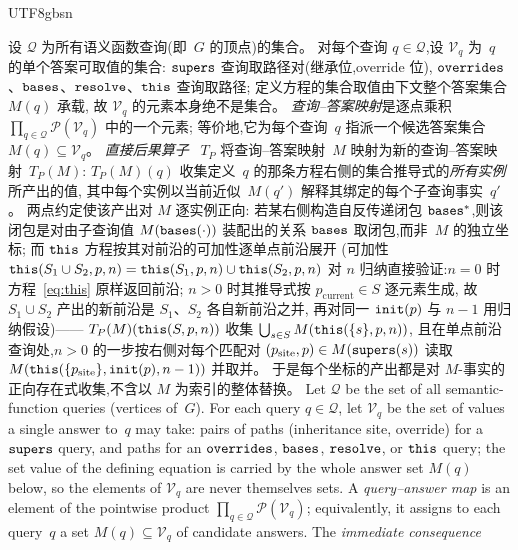\begin{CJK*}{UTF8}{gbsn}
\begin{definition}%
  \label{def:tp-operator}
\ifPaperChinese
  设 $\mathcal{Q}$ 为所有语义函数查询(即~$G$ 的顶点)的集合。
  对每个查询 $q \in \mathcal{Q}$,设 $\mathcal{V}_q$ 为~$q$ 的单个答案可取值的集合:
  $\mathtt{supers}$ 查询取路径对(继承位,override 位),
  $\mathtt{overrides}$、$\mathtt{bases}$、$\mathtt{resolve}$、$\mathtt{this}$ 查询取路径;
  定义方程的集合取值由下文整个答案集合 $M(q)$ 承载,
  故 $\mathcal{V}_q$ 的元素本身绝不是集合。
  \emph{查询--答案映射}是逐点乘积
  $\prod_{q \in \mathcal{Q}} \mathcal{P}(\mathcal{V}_q)$ 中的一个元素;
  等价地,它为每个查询~$q$ 指派一个候选答案集合 $M(q) \subseteq \mathcal{V}_q$。
  \emph{直接后果算子}~\cite{vanemden1976-predicate-logic-semantics}
  $T_P$ 将查询--答案映射~$M$ 映射为新的查询--答案映射~$T_P(M)$:
  $T_P(M)(q)$ 收集定义~$q$ 的那条方程右侧的集合推导式的\emph{所有实例}所产出的值,
  其中每个实例以当前近似~$M(q')$ 解释其绑定的每个子查询事实~$q'$。
  两点约定使该产出对 $M$ 逐实例正向:
  若某右侧构造自反传递闭包 $\mathtt{bases}^*$,则该闭包是对由子查询值
  $M(\mathtt{bases}(\cdot))$ 装配出的关系 $\mathtt{bases}$ 取闭包,而非~$M$ 的独立坐标;
  而 $\mathtt{this}$ 方程按其对前沿的可加性逐单点前沿展开
  (可加性
  $\mathtt{this}(S_1 \cup S_2, p, n) = \mathtt{this}(S_1, p, n) \cup \mathtt{this}(S_2, p, n)$
  对 $n$ 归纳直接验证:$n = 0$ 时方程~\eqref{eq:this} 原样返回前沿;
  $n > 0$ 时其推导式按 $p_{\mathrm{current}} \in S$ 逐元素生成,
  故 $S_1 \cup S_2$ 产出的新前沿是 $S_1$、$S_2$ 各自新前沿之并,
  再对同一 $\mathtt{init}(p)$ 与 $n-1$ 用归纳假设)——
  $T_P(M)(\mathtt{this}(S, p, n))$ 收集
  $\bigcup_{s \in S} M(\mathtt{this}(\{s\}, p, n))$,
  且在单点前沿查询处,$n > 0$ 的一步按右侧对每个匹配对
  $(p_{\mathrm{site}}, p) \in M(\mathtt{supers}(s))$ 读取
  $M(\mathtt{this}(\{p_{\mathrm{site}}\}, \mathtt{init}(p), n-1))$ 并取并。
  于是每个坐标的产出都是对 $M$-事实的正向存在式收集,不含以 $M$
  为索引的整体替换。
\else
  Let $\mathcal{Q}$ be the set of all
  semantic-function queries
  (vertices of~$G$).
  For each query $q \in \mathcal{Q}$, let
  $\mathcal{V}_q$ be the set of values a single answer to~$q$ may
  take: pairs of paths (inheritance site, override) for a $\mathtt{supers}$
  query, and paths for an $\mathtt{overrides}$, $\mathtt{bases}$, $\mathtt{resolve}$, or
  $\mathtt{this}$ query; the set value of the defining equation is carried
  by the whole answer set $M(q)$ below, so the elements of
  $\mathcal{V}_q$ are never themselves sets.
  A \emph{query--answer map} is an element of the
  pointwise product
  $\prod_{q \in \mathcal{Q}} \mathcal{P}(\mathcal{V}_q)$;
  equivalently, it assigns to each query~$q$ a set
  $M(q) \subseteq \mathcal{V}_q$ of candidate answers.
  The \emph{immediate consequence
}
\end{definition}
\end{CJK*}
